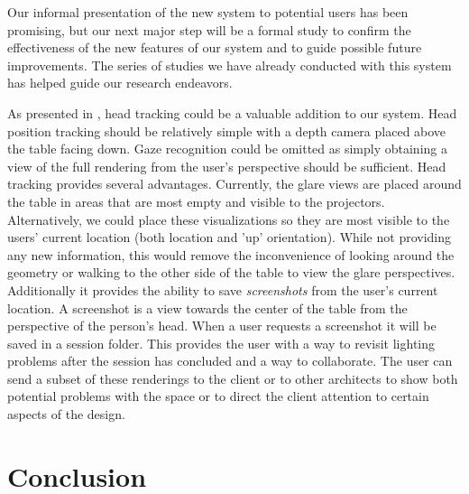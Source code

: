 \documentclass[10pt,twocolumn,letterpaper]{article}
\begin{document}
Our informal presentation of the new system to potential users has
been promising, but our next major step will be a formal study to
confirm the effectiveness of the new features of our system and to
guide 
possible future improvements.  The series of studies we have
already conducted with this system has helped guide our research
endeavors.

As presented in \cite{Garstka_Peters_2004}, head tracking could be a
valuable addition to our system.  Head position tracking should be
relatively simple with a depth camera placed above the table facing
down.  Gaze recognition could be omitted as simply obtaining a view of
the full rendering from the user's perspective should be sufficient.
%
Head tracking provides several advantages.  Currently, the glare views
are placed around the table in areas that are most empty and visible
to the projectors.  Alternatively, we could place these visualizations
so they are most visible to the users' current location (both location
and 'up' orientation).
While not providing any new information, this would remove the
inconvenience of looking around the geometry or walking to the other
side of the table to view the glare perspectives.
%
Additionally it provides the ability to save \emph{screenshots} from
the user's current location.  A screenshot is a view towards the
center of the table from the perspective of the person's head.  When a
user requests a screenshot it will be saved in a session folder.  This
provides the user with a way to revisit lighting problems after the
session has concluded and a way to collaborate.  The user can send a
subset of these renderings to the client or to other architects to
show both potential problems with the space or to direct the client
attention to certain aspects of the design.


\section{Conclusion}
\end{document}
